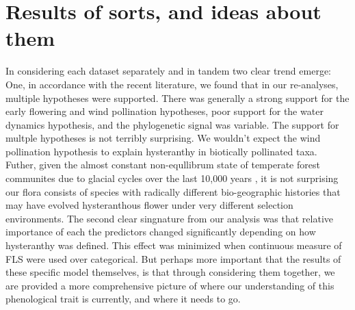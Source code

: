\documentclass[12pt]{article}\usepackage[]{graphicx}\usepackage[]{color}
\begin{document}
{\section*{Results of sorts, and ideas about them}
\indent\indent In considering each dataset separately and in tandem two clear trend emerge: One, in accordance with the recent literature, we found that in our re-analyses, multiple hypotheses were supported. There was generally a strong support for the early flowering and wind pollination hypotheses, poor support for the water dynamics hypothesis, and the phylogenetic signal was variable. The support for multple hypotheses is not terribly surprising. We wouldn't expect the wind pollination hypothesis to explain hysteranthy in biotically pollinated taxa. Futher, given the almost constant non-equllibrum state of temperate forest communites due to glacial cycles over the last 10,000 years \citep{Barnes}, it is not surprising our flora consists of species with radically different bio-geographic histories that may have evolved hysteranthous flower under very different selection environments.  The second clear singnature from our analysis was that relative importance of each the predictors changed significantly depending on how hysteranthy was defined. This effect was minimized when continuous measure of FLS were used over categorical. But perhaps more important that the results of these specific model themselves, is that through considering them together, we are provided a more comprehensive picture of where our understanding of this phenological trait is currently, and where it needs to go. 

}
\end{document}
